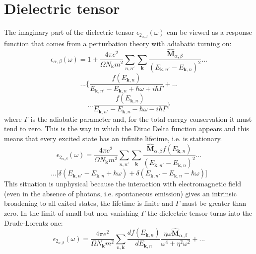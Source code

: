 \documentclass[twocolumn]{article}
\begin{document}
\section{Dielectric tensor}
The imaginary part of the dielectric tensor $\epsilon_{2_{\alpha,\beta}}(\omega)$ can be viewed as a response function
that comes from a perturbation theory with adiabatic turning on:
\begin{displaymath}
\epsilon_{\alpha,\beta}(\omega)=1+\frac{4 \pi e^2}{\Omega N_{\textbf{k}} m^2}\sum_{n,n'}\sum_{\textbf{k}}
\frac{\hat{\textbf{M}}_{\alpha,\beta}}{(E_{\textbf{k},n'}-E_{\textbf{k},n})^2}...
\end{displaymath}
\begin{displaymath}
...\Bigg\{\frac{f(E_{\textbf{k},n})}{E_{\textbf{k},n'}-E_{\textbf{k},n}+\hbar\omega+i\hbar\Gamma}+...
\end{displaymath}
\begin{equation}
...\frac{f(E_{\textbf{k},n})}{E_{\textbf{k},n'}-E_{\textbf{k},n}-\hbar\omega-i\hbar\Gamma}\Bigg\}
\end{equation}
where $\Gamma$ is the adiabatic parameter and, for the total energy conservation it must tend to zero.
This is the way in
which the Dirac Delta function appears and this means that every excited state has an infinite lifetime, i.e. is stationary.
\begin{displaymath}
\epsilon_{2_{\alpha,\beta}}(\omega)=\frac{4 \pi e^2}{\Omega N_{\textbf{k}} m^2}\sum_{n,n'}\sum_{\textbf{k}}
\frac{\hat{\textbf{M}}_{\alpha,\beta} f(E_{\textbf{k},n})}{(E_{\textbf{k},n'}-E_{\textbf{k},n})^2}...
\end{displaymath}
\begin{equation}
...\bigg[\delta(E_{\textbf{k},n'}-E_{\textbf{k},n}+\hbar\omega)+\delta(E_{\textbf{k},n'}-
E_{\textbf{k},n}-\hbar\omega)\bigg]
\end{equation}
This situation is unphysical because the interaction with
electromagnetic field (even in the absence of photons, i.e. spontaneous emission) gives an intrinsic broadening to all exited
states, the lifetime is finite and $\Gamma$ must be greater than zero. In the limit of small but non vanishing $\Gamma$
the dielectric tensor turns into the Drude-Lorentz one:
\begin{displaymath}
\epsilon_{2_{\alpha,\beta}}(\omega)=\frac{4 \pi e^2}{\Omega N_{\textbf{k}} m^2}\sum_{n,\textbf{k}}
\frac{d f(E_{\textbf{k},n})}{d E_{\textbf{k},n}}\frac{\eta \omega \hat{\textbf{M}}_{\alpha,\beta}}
{\omega^4+\eta^2 \omega^2}+...
\end{displaymath}
\end{document}
